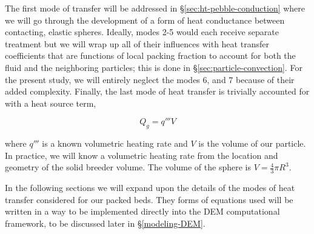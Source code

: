 The first mode of transfer will be addressed in \S\ref{sec:ht-pebble-conduction} where we will go through the development of a form of heat conductance between contacting, elastic spheres. Ideally, modes 2-5 would each receive separate treatment but we will wrap up all of their influences with heat transfer coefficients that are functions of local packing fraction to account for both the fluid and the neighboring particles; this is done in \S\ref{sec:particle-convection}. For the present study, we will entirely neglect the modes 6, and 7 because of their added complexity. Finally, the last mode of heat transfer is trivially accounted for with a heat source term,

\begin{equation}\label{eq:nuclear-heating-term}
	Q_g = q'''V
\end{equation}

where $q'''$ is a known volumetric heating rate and $V$ is the volume of our particle. In practice, we will know a volumetric heating rate from the location and geometry of the solid breeder volume. The volume of the sphere is $V = \frac{4}{3}\pi R^3$.

In the following sections we will expand upon the details of the modes of heat transfer considered for our packed beds. They forms of equations used will be written in a way to be implemented directly into the DEM computational framework, to be discussed later in \S\ref{modeling-DEM}.









